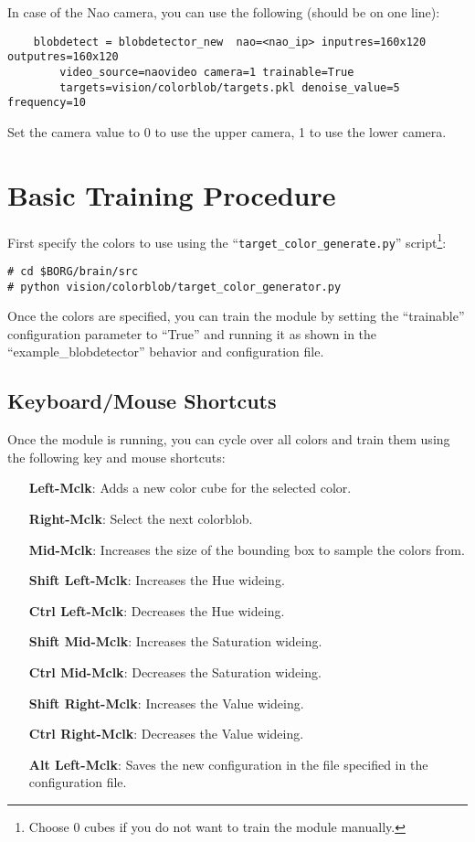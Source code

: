 \documentclass[a4paper, 10pt]{article}
\begin{document}
In case of the Nao camera, you can use the following (should be on one line):
\begin{lstlisting}
    blobdetect = blobdetector_new  nao=<nao_ip> inputres=160x120 outputres=160x120
        video_source=naovideo camera=1 trainable=True
        targets=vision/colorblob/targets.pkl denoise_value=5 frequency=10
\end{lstlisting}

Set the camera value to 0 to use the upper camera, 1 to use the lower camera.

\section{Basic Training Procedure}
\label{sec:training}

First specify the colors to use using the ``\lstinline{target_color_generate.py}'' script\footnote{Choose 0 cubes if you do not want to train the module manually.}:
\begin{lstlisting}
# cd $BORG/brain/src
# python vision/colorblob/target_color_generator.py
\end{lstlisting}

Once the colors are specified, you can train the module by setting the ``trainable'' configuration parameter to ``True'' and running it as shown in the ``example\_blobdetector'' behavior and configuration file.

\subsection{Keyboard/Mouse Shortcuts}

Once the module is running, you can cycle over all colors and train them using the following key and mouse shortcuts:

\begin{enumerate}
    \item[\textbf{Left-Mclk}:] Adds a new color cube for the selected color.
    \item[\textbf{Right-Mclk}:] Select the next colorblob.
    \item[\textbf{Mid-Mclk}:] Increases the size of the bounding box to sample the colors from.
    \item[\textbf{Shift Left-Mclk}:] Increases the Hue wideing.
    \item[\textbf{Ctrl Left-Mclk}:] Decreases the Hue wideing.
    \item[\textbf{Shift Mid-Mclk}:] Increases the Saturation wideing.
    \item[\textbf{Ctrl Mid-Mclk}:] Decreases the Saturation wideing.
    \item[\textbf{Shift Right-Mclk}:] Increases the Value wideing.
    \item[\textbf{Ctrl Right-Mclk}:] Decreases the Value wideing.
    \item[\textbf{Alt Left-Mclk}:] Saves the new configuration in the file specified in the configuration file.
\end{enumerate}
\end{document}

